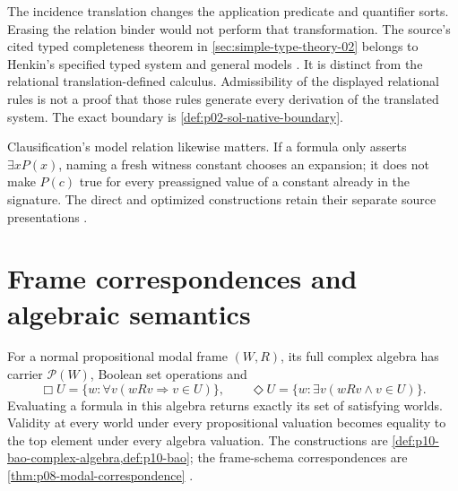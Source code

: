 The incidence translation changes the application predicate and quantifier
sorts. Erasing the relation binder would not perform that transformation.
The source's cited typed completeness theorem in
\cref{sec:simple-type-theory-02}
belongs to Henkin's specified typed system and general models
\cite{Henkin1950}. It is distinct from the relational translation-defined
calculus. Admissibility of the displayed relational rules is not a proof
that those rules generate every derivation of the translated system.
The exact boundary is \cref{def:p02-sol-native-boundary}.

Clausification's model relation likewise matters. If a formula only asserts
\(\exists xP(x)\), naming a fresh witness constant chooses an expansion;
it does not make \(P(c)\) true for every preassigned value of a constant
already in the signature. The direct and optimized constructions retain
their separate source presentations
\cite{NonnengartWeidenbach2001SmallClauses}.

\section{Frame correspondences and algebraic semantics}
\label{sec:p14-translation-frame-algebra}


For a normal propositional modal frame \((W,R)\), its full complex algebra
has carrier \(\mathcal P(W)\), Boolean set operations and
\[
 \Box U=\{w:\forall v(wRv\Longrightarrow v\in U)\},\qquad
 \Diamond U=\{w:\exists v(wRv\land v\in U)\}.
\]
Evaluating a formula in this algebra returns exactly its set of satisfying
worlds. Validity at every world under every propositional valuation becomes
equality to the top element under every algebra valuation. The constructions
are \cref{def:p10-bao-complex-algebra,def:p10-bao}; the frame-schema
correspondences are \cref{thm:p08-modal-correspondence}
\cite{Chellas1980,Venema2005Preprint}.

